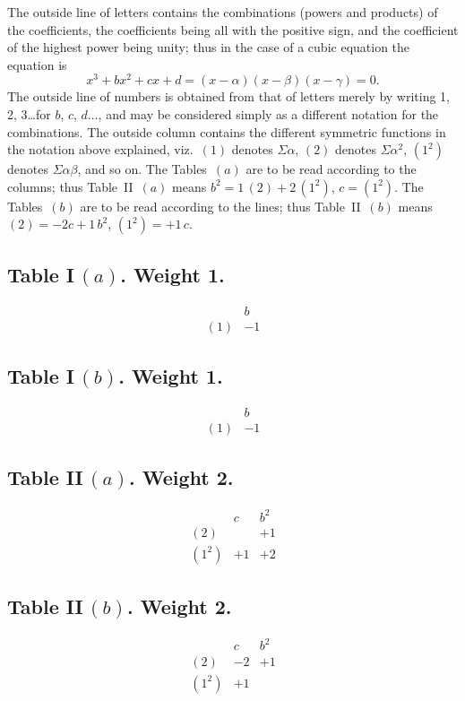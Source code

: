 \documentclass[11pt,a4paper]{article}
\begin{document}
The outside line of letters contains the combinations (powers and products) of
the coefficients, the coefficients being all with the positive sign, and the
coefficient of the highest power being unity; thus in the case of a cubic
equation the equation is
\[
x^3 + bx^2 + cx + d = (x - \alpha)(x - \beta)(x - \gamma) = 0.
\]
The outside line of numbers is obtained from that of letters merely by writing
1, 2, 3\ldots for $b$, $c$, $d\ldots$, and may be considered simply as a
different notation for the combinations. The outside column contains the
different symmetric functions in the notation above explained, viz.\ $(1)$
denotes $\Sigma\alpha$, $(2)$ denotes $\Sigma\alpha^2$, $(1^2)$ denotes
$\Sigma\alpha\beta$, and so on. The Tables~$(a)$ are to be read according to
the columns; thus Table~II~$(a)$ means $b^2 = 1\,(2) + 2\,(1^2)$,
$c = (1^2)$. The Tables~$(b)$ are to be read according to the lines; thus
Table~II~$(b)$ means $(2) = -2c + 1\,b^2$, $(1^2) = +1\,c$.

\newpage
\subsection*{Table I\,$(a)$. Weight 1.}
\[
\begin{array}{c|c}
& b \\ \hline
(1) & -1
\end{array}
\]

\subsection*{Table I\,$(b)$. Weight 1.}
\[
\begin{array}{c|c}
& b \\ \hline
(1) & -1
\end{array}
\]

\subsection*{Table II\,$(a)$. Weight 2.}
\[
\begin{array}{c|cc}
& c & b^2 \\ \hline
(2) & & +1 \\
(1^2) & +1 & +2
\end{array}
\]

\subsection*{Table II\,$(b)$. Weight 2.}
\[
\begin{array}{c|cc}
& c & b^2 \\ \hline
(2) & -2 & +1 \\
(1^2) & +1 &
\end{array}
\]
\end{document}
